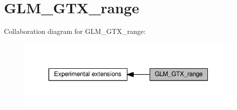 \hypertarget{group__gtx__range}{}\section{G\+L\+M\+\_\+\+G\+T\+X\+\_\+range}
\label{group__gtx__range}
Collaboration diagram for G\+L\+M\+\_\+\+G\+T\+X\+\_\+range\+:
\nopagebreak
\begin{figure}[H]
\begin{center}
\leavevmode
\includegraphics[width=332pt]{d2/d6b/group__gtx__range}
\end{center}
\end{figure}
